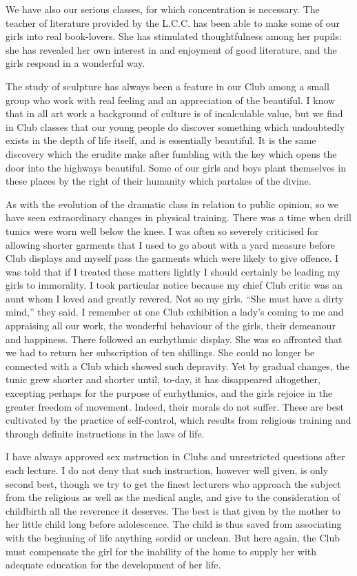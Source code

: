 We have also our serious classes, for which concentration
is necessary. The teacher of literature provided by
the L.C.C. has been able to make some of our girls into
real book-lovers. She has stimulated thoughtfulness
among her pupils: she has revealed her own interest in
and enjoyment of good literature, and the girls respond
in a wonderful way.

The study of sculpture has always been a feature in
our Club among a small group who work with real feeling
and an appreciation of the beautiful. I know that in
all art work a background of culture is of incalculable
value, but we find in Club classes that our young people
do discover something which undoubtedly exists in the
depth of life itself, and is essentially beautiful. It is the
same discovery which the erudite make after fumbling
with the key which opens the door into the highways
beautiful. Some of our girls and boys plant themselves
in these places by the right of their humanity which
partakes of the divine.

As with the evolution of the dramatic class in relation
to public opinion, so we have seen extraordinary changes
in physical training. There was a time when drill tunics
were worn well below the knee. I was often so severely
criticised for allowing shorter garments that I used to go
about with a yard measure before Club displays and
myself pass the garments which were likely to give offence.
I was told that if I treated these matters lightly I should
certainly be leading my girls to immorality. I took
particular notice because my chief Club critic was an aunt
whom I loved and greatly revered. Not so my girls.
“She must have a dirty mind,” they said. I remember
at one Club exhibition a lady’s coming to me and
appraising all our work, the wonderful behaviour of the girls,
their demeanour and happiness. There followed an
eurhythmic display. She was so affronted that we had
to return her subscription of ten shillings. She could no
longer be connected with a Club which showed such
depravity. Yet by gradual changes, the tunic grew
shorter and shorter until, to-day, it has disappeared
altogether, excepting perhaps for the purpose of eurhythmics,
and the girls rejoice in the greater freedom of movement.
Indeed, their morals do not suffer. These are best
cultivated by the practice of self-control, which results from
religious training and through definite instructions in the
laws of life.

I have always approved sex mstruction in Clubs and
unrestricted questions after each lecture. I do not deny
that such instruction, however well given, is only second
best, though we try to get the finest lecturers
who approach the subject from the religious as well as
the medical angle, and give to the consideration of
childbirth all the reverence it deserves. The best is that given
by the mother to her little child long before adolescence.
The child is thus saved from associating with the
beginning of life anything sordid or unclean. But here again,
the Club must compensate the girl for the inability of
the home to supply her with adequate education for the
development of her life.

